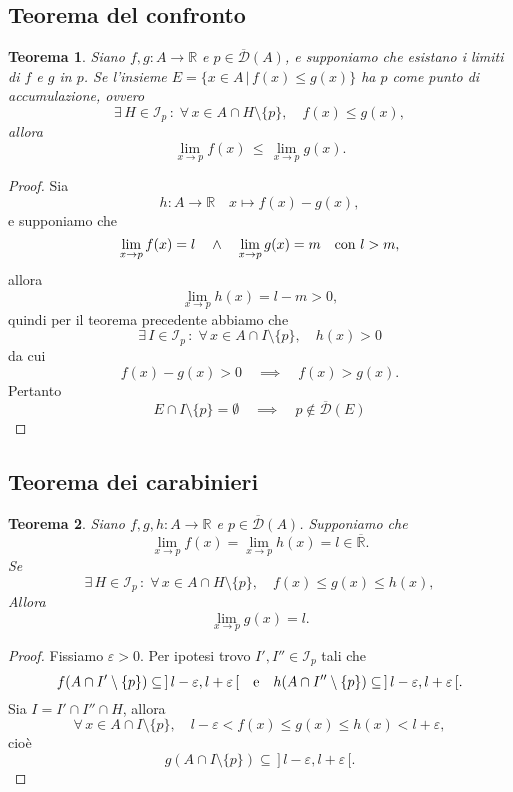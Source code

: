 \documentclass{article}
\theoremstyle{plain}
\newtheorem{thm}{Teorema}[section]
\theoremstyle{definition}
\theoremstyle{remark}
\begin{document}
\vspace{10pt}

\subsection{Teorema del confronto}

\vspace{10pt}

\begin{bxthm}
\begin{thm}
    Siano $f,g:A\to\mathbb{R}$ e $p\in\overline{\mathcal{D}}(A)$, e supponiamo che esistano i limiti di $f$ e $g$ in $p$. 
    Se l'insieme $E=\{x\in A \,|\, f(x)\leq g(x)\}$ ha $p$ come punto di accumulazione, ovvero
    \[\exists\, H\in \mathcal{I}_p\,:\;\forall\, x\in A\cap H\setminus\{p\},\quad f(x)\leq g(x),\]
    allora \[\lim_{x\to p}f(x)\,\leq\, \lim_{x\to p}g(x).\]
\end{thm}
\end{bxthm}
\begin{proof}
    Sia 
    \[h:A\to\mathbb{R}\quad x\mapsto f(x)-g(x),\]
    e supponiamo che 
    \[\lim_{x\to p}f(x)=l \quad\land\quad \lim_{x\to p}g(x)=m\quad \textup{con }l>m,\]
    allora \[\lim_{x\to p}h(x)=l-m>0,\] quindi per il teorema precedente abbiamo che 
    \[\exists\, I\in \mathcal{I}_p \,:\;\forall\, x\in A\cap I\setminus\{p\},\quad h(x)>0\]
    da cui \[f(x)-g(x)>0\quad\implies\quad f(x)>g(x).\]
    Pertanto \[E\cap I\setminus\{p\}=\emptyset\quad\implies\quad p\notin\overline{\mathcal{D}}(E)\]
\end{proof}

\vspace{10pt}

\subsection{Teorema dei carabinieri}

\vspace{10pt}

\begin{bxthm}
\begin{thm}
    Siano $f,g,h:A\to\mathbb{R}$ e $p\in\overline{\mathcal{D}}(A)$.
    Supponiamo che 
    \[\lim_{x\to p}f(x)=\lim_{x\to p}h(x)=l\in\overline{\mathbb{R}}.\]
    Se \[\exists\, H\in \mathcal{I}_p\,:\;\forall\, x\in A\cap H\setminus\{p\},\quad f(x)\leq g(x)\leq h(x),\]
    Allora \[\lim_{x\to p}g(x)=l.\]
\end{thm}
\end{bxthm}
\begin{proof}
    Fissiamo $\varepsilon>0$.
    Per ipotesi trovo $I',I''\in \mathcal{I}_p$ tali che 
    \[f(A\cap I'\setminus\{p\})\subseteq\,]\,l-\varepsilon,l+\varepsilon\,[\quad\textup{e}\quad h(A\cap I''\setminus\{p\})\subseteq\,]\,l-\varepsilon,l+\varepsilon\,[.\]
    Sia $I=I'\cap I''\cap H$, allora 
    \[\forall\, x\in A\cap I\setminus\{p\},\quad l-\varepsilon<f(x)\leq g(x)\leq h(x)<l+\varepsilon,\]
    cioè \[g(A\cap I\setminus\{p\})\subseteq\,]\,l-\varepsilon,l+\varepsilon\,[.\]
\end{proof}
\end{document}
